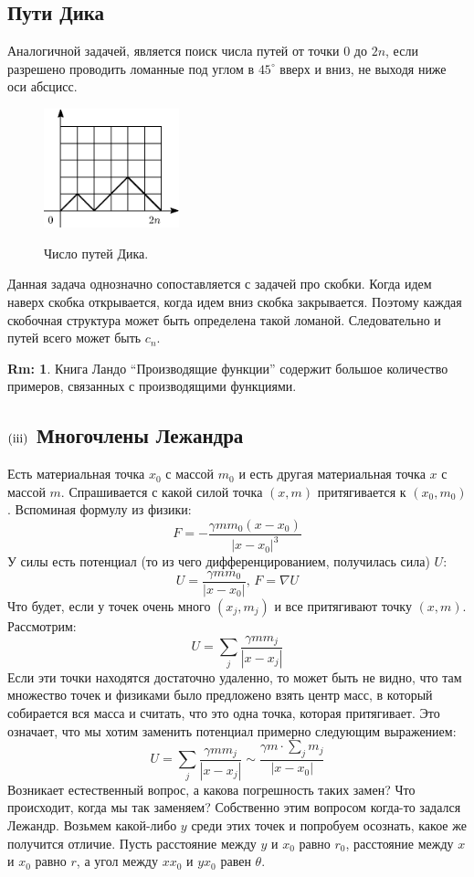\documentclass[12pt]{article}
\newcommand{\RN}[1]{%
	\textup{\uppercase\expandafter{\romannumeral#1}}%
}
\theoremstyle{definition}
\newtheorem{rem}{Rm:}
\newcommand{\ddsum}[2]{\displaystyle\sum\limits_{#1}^{#2}}
\begin{document}
\subsection*{Пути Дика}
Аналогичной задачей, является поиск числа путей от точки $0$ до $2n$, если разрешено проводить ломанные под углом в $45^\circ$ вверх и вниз, не выходя ниже оси абсцисс.  
\begin{figure}[H]
	\centering
	\includegraphics[width=0.35\textwidth]{MA3L18_3.eps}
	\label{MA3L18_3}
	\caption{Число путей Дика.}
	\label{fig:пути Дика}
\end{figure}
Данная задача однозначно сопоставляется с задачей про скобки. Когда идем наверх скобка открывается, когда идем вниз скобка закрывается. Поэтому каждая скобочная структура может быть определена такой ломаной. Следовательно и путей всего может быть $c_{n}$.

\begin{rem}
	Книга Ландо ``Производящие функции'' содержит большое количество примеров, связанных с производящими функциями.
\end{rem}

\subsection*{$(\RN{3})$ Многочлены Лежандра}
Есть материальная точка $x_0$ с массой $m_0$ и есть другая материальная точка $x$ с массой $m$. Спрашивается с какой силой точка $(x,m)$ притягивается к $(x_0,m_0)$. Вспоминая формулу из физики:
$$
	F = - \dfrac{\gamma m m_0 (x - x_0)}{|x - x_0|^3}
$$
У силы есть потенциал (то из чего дифференцированием, получилась сила) $U$:
$$
	U = \dfrac{\gamma m m_0}{|x - x_0|}, \, F = \nabla U
$$
Что будет, если у точек очень много $(x_j, m_j)$ и все притягивают точку $(x,m)$. Рассмотрим:
$$
	U = \ddsum{j}{}\dfrac{\gamma m m_j}{|x - x_j|}
$$
Если эти точки находятся достаточно удаленно, то может быть не видно, что там множество точек и физиками было предложено взять центр масс, в который собирается вся масса и считать, что это одна точка, которая притягивает. Это означает, что мы хотим заменить потенциал примерно следующим выражением:
$$
	U = \ddsum{j}{}\dfrac{\gamma m m_j}{|x - x_j|} \sim \dfrac{\gamma m {\cdot}\sum\limits_{j}m_j}{|x - x_0|}
$$
Возникает естественный вопрос, а какова погрешность таких замен? Что происходит, когда мы так заменяем? Собственно этим вопросом когда-то задался Лежандр. Возьмем какой-либо $y$ среди этих точек и попробуем осознать, какое же получится отличие. Пусть расстояние между $y$ и $x_0$ равно $r_0$, расстояние между $x$ и $x_0$ равно $r$, а угол между $x x_0$ и $y x_0$ равен $\theta$.
\end{document}
